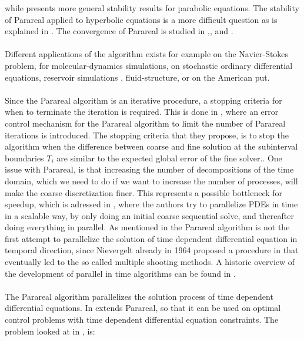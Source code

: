 while \cite{bal2005convergence} presents more general stability results for parabolic equations. The stability of Parareal applied to hyperbolic equations is a more difficult question as is explained in \cite{dai2013stable}. The convergence of Parareal is studied in \cite{lions2001resolution},\cite{bal2005convergence},\cite{gander2007analysis} and \cite{gander2007superlinear}.
\\
\\
Different applications of the algorithm exists for example on the Navier-Stokes problem\cite{fischer2005parareal}, for molecular-dynamics simulations\cite{baffico2002parallel}, on stochastic ordinary differential equations\cite{bal2003parallelization}, reservoir simulations \cite{garrido2005convergent}, fluid-structure\cite{farhat2003time}, or on the American put\cite{bal2002parareal}.
\\
\\
Since the Parareal algorithm is an iterative procedure, a stopping criteria for when to terminate the iteration is required. This is done in \cite{lepsa2010efficient}, where an error control mechanism for the Parareal algorithm to limit the number of Parareal iterations is introduced. The stopping criteria that they propose, is to stop the algorithm when the difference between coarse and fine solution at the subinterval boundaries $T_i$ are similar to the expected global error of the fine solver.\cite{aubanel2011scheduling}. One issue with Parareal, is that increasing the number of decompositions of the time domain, which we need to do if we want to increase the number of processes, will make the coarse discretization finer. This represents a possible bottleneck for speedup, which is adressed in \cite{rao2014adjoint}, where the authors try to parallelize PDEs in time in a scalable way, by only doing an initial coarse sequential solve, and thereafter doing everything in parallel. As mentioned in \cite{gander2007superlinear} the Parareal algorithm is not the first attempt to parallelize the solution of time dependent differential equation in temporal direction, since Nievergelt already in 1964 proposed a procedure in \cite{nievergelt1964parallel} that eventually led to the so called multiple shooting methods. A historic overview of the development of parallel in time algorithms can be found in \cite{gander201550}.
\\
\\
The Parareal algorithm parallelizes the solution process of time dependent differential equations. In \cite{maday2002parareal} extends Parareal, so that it can be used on optimal control problems with time dependent differential equation constraints. The problem looked at in \cite{maday2002parareal}, is: 
